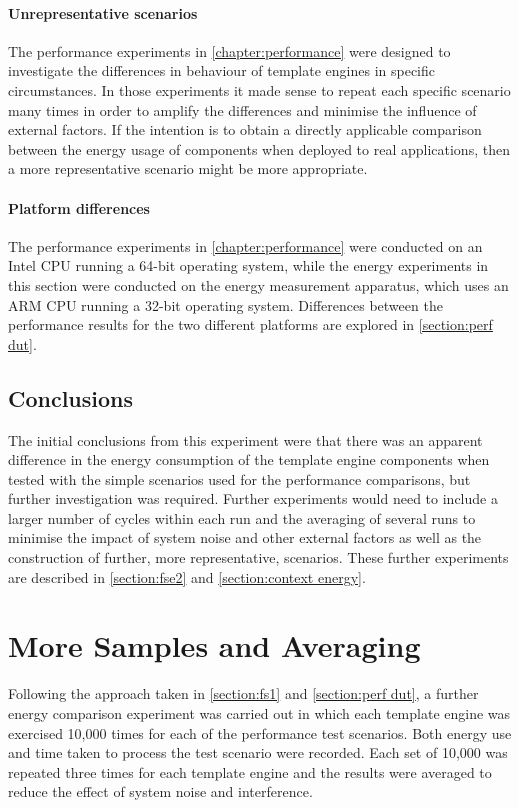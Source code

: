 \paragraph{Unrepresentative scenarios}
The performance experiments in \autoref{chapter:performance} were designed to investigate the differences in behaviour of \gls{template engine}s in specific circumstances. In those experiments it made sense to repeat each specific scenario many times in order to amplify the differences and minimise the influence of external factors. If the intention is to obtain a directly applicable comparison between the energy usage of components when deployed to real applications, then a more representative scenario might be more appropriate.

\paragraph{Platform differences}
The performance experiments in \autoref{chapter:performance} were conducted on an Intel CPU running a 64-bit operating system, while the energy experiments in this section were conducted on the energy measurement apparatus, which uses an ARM CPU running a 32-bit operating system. Differences between the performance results for the two different platforms are explored in \autoref{section:perf dut}.

\subsection{Conclusions}
\label{fse conclusions}

The initial conclusions from this experiment were that there was an apparent difference in the energy consumption of the \gls{template engine} components when tested with the simple scenarios used for the performance comparisons, but further investigation was required. Further experiments would need to include a larger number of cycles within each run and the averaging of several runs to minimise the impact of system noise and other external factors as well as the construction of further, more representative, scenarios. These further experiments are described in \autoref{section:fse2} and \autoref{section:context energy}.


\section{More Samples and Averaging}
\label{section:fse2}

Following the approach taken in \autoref{section:fs1} and \autoref{section:perf dut}, a further energy comparison experiment was carried out in which each \gls{template engine} was exercised 10,000 times for each of the performance test scenarios. Both energy use and time taken to process the test scenario were recorded. Each set of 10,000 was repeated three times for each \gls{template engine} and the results were averaged to reduce the effect of system noise and interference.

